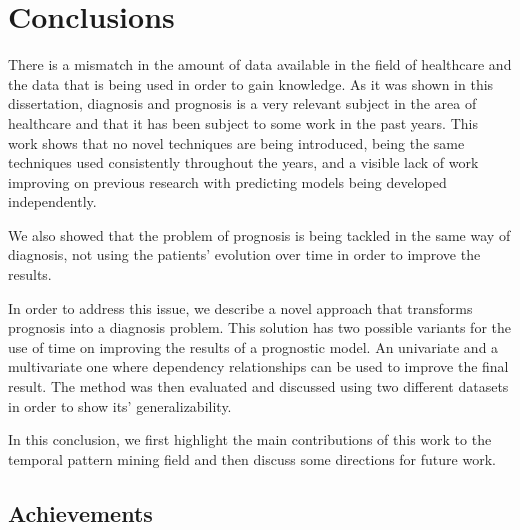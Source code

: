 
\chapter{Conclusions}
\label{chapter:conclusions}

There is a mismatch in the amount of data available in the field of healthcare and the data that is being used in order to gain knowledge.
 As it was shown in this dissertation, diagnosis and prognosis is a very relevant subject in the area of healthcare and that it has been subject 
 to some work in the past years. This work shows that no novel techniques are being introduced, being the same techniques used consistently throughout the years, and a visible lack of work improving on previous research with predicting models being developed independently. 

We also showed that the problem of prognosis is being tackled in the same way of diagnosis, not using the patients’ evolution over time
 in order to improve the results. 

In order to address this issue, we describe a novel approach that transforms prognosis into a diagnosis problem. This solution has two possible variants for the use of time on improving the results of a prognostic model. An univariate and a multivariate one where dependency relationships can be used to improve the final result.
The method was then evaluated and discussed using two different datasets in order to show its’ generalizability.

In this conclusion, we first highlight the main contributions of this work to the temporal pattern mining field and then discuss some directions for future work.

\section{Achievements}
\label{section:achievements}

